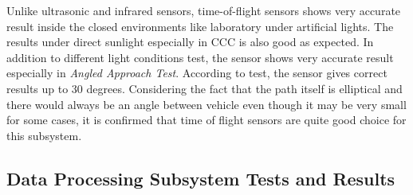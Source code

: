\documentclass[a4paper,12pt]{article}
\begin{document}
\begin{enumerate}
	Unlike ultrasonic and infrared sensors, time-of-flight sensors shows very accurate result inside the closed environments like laboratory under artificial lights. The results under direct sunlight especially in CCC is also good as expected. In addition to different light conditions test, the sensor shows very accurate result especially in \textit{Angled Approach Test}. According to test, the sensor gives correct results up to 30 degrees. Considering the fact that the path itself is elliptical and there would always be an angle between vehicle even though it may be very small for some cases, it is confirmed that time of flight sensors are quite good choice for this subsystem. 
	
\end{enumerate}




\subsection {Data Processing Subsystem Tests and Results}	
\end{document}
